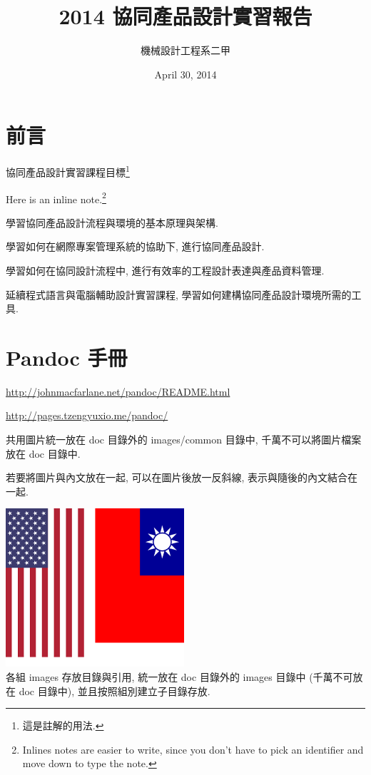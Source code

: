 \documentclass[]{article}
\title{2014 協同產品設計實習報告}
\author{機械設計工程系二甲}
\date{April 30, 2014}
\begin{document}
\maketitle

{
\hypersetup{linkcolor=black}
\setcounter{tocdepth}{3}
\tableofcontents
}
\section{前言}\label{ux524dux8a00}

協同產品設計實習課程目標\footnote{這是註解的用法.}

Here is an inline note.\footnote{Inlines notes are easier to write,
  since you don't have to pick an identifier and move down to type the
  note.}

學習協同產品設計流程與環境的基本原理與架構.

學習如何在網際專案管理系統的協助下, 進行協同產品設計.

學習如何在協同設計流程中, 進行有效率的工程設計表達與產品資料管理.

延續程式語言與電腦輔助設計實習課程,
學習如何建構協同產品設計環境所需的工具.

\section{Pandoc 手冊}\label{pandoc-ux624bux518a}

\url{http://johnmacfarlane.net/pandoc/README.html}

\url{http://pages.tzengyuxio.me/pandoc/}

共用圖片統一放在 doc 目錄外的 images/common 目錄中,
千萬不可以將圖片檔案放在 doc 目錄中.

若要將圖片與內文放在一起, 可以在圖片後放一反斜線,
表示與隨後的內文結合在一起.

\includegraphics{./../images/common/c2_w14_task2.png}\\ 各組 images
存放目錄與引用, 統一放在 doc 目錄外的 images 目錄中 (千萬不可放在 doc
目錄中), 並且按照組別建立子目錄存放.
\end{document}
